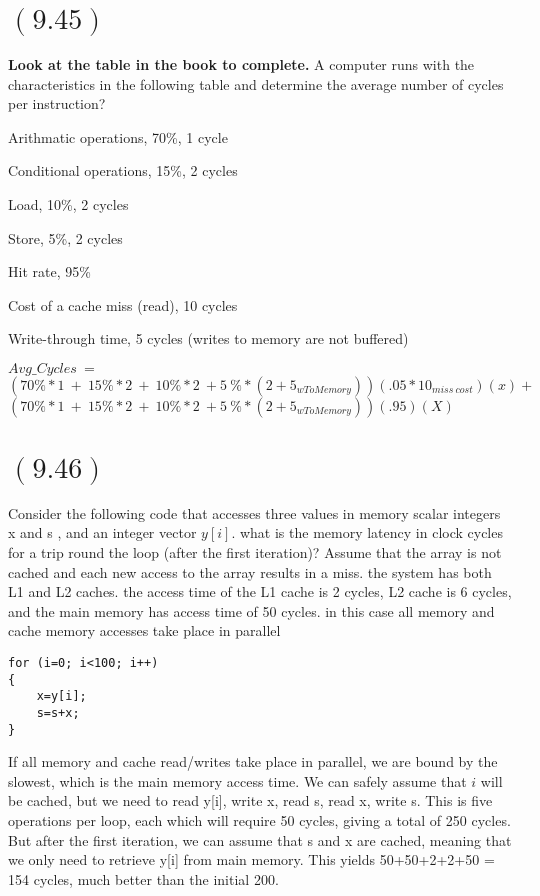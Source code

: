 \documentclass[letterpaper,12pt,titlepage]{article}
\begin{document}
\newpage
\section*{$(9.45)$} \textbf{Look at the table in the book to complete.} A computer runs with the characteristics in the following table and determine the average number of cycles per instruction?

Arithmatic operations, 70\%, 1 cycle

 
Conditional operations, 15\%, 2 cycles


Load, 10\%, 2 cycles


Store, 5\%, 2 cycles


Hit rate, 95\%


Cost of a cache miss (read), 10 cycles

Write-through time, 5 cycles (writes to memory are not buffered)

\begin{mdframed}[style=MyFrame]
$Avg\_Cycles~=~$\\
$(70\%*1~+~15\%*2~+~10\%*2~+5~\%*(2+5_{wToMemory}))(.05*10_{miss~cost})(x)+$\\
              $(70\%*1~+~15\%*2~+~10\%*2~+5~\%*(2+5_{wToMemory}))(.95)(X)$

\end{mdframed}

\section*{$(9.46)$} Consider the following code that accesses three values in memory scalar integers x and s , and an integer vector $y[i]$. what is the memory latency in clock cycles for a trip round the loop (after the first iteration)? Assume that the array is not cached and each new access to the array results in a miss.
the system has both L1 and L2 caches. the access time of the L1 cache is 2 cycles, L2 cache is 6 cycles, and the main memory has access time of 50 cycles. in this case all memory and cache memory accesses take place in parallel
\begin{verbatim}
for (i=0; i<100; i++)
{
    x=y[i];
    s=s+x;
}
\end{verbatim}

\begin{mdframed}[style=MyFrame]
If all memory and cache read/writes take place in parallel, we are bound by the slowest, which is the main memory access time. We can safely assume that $i$ will be cached, but we need to read y[i], write x, read s, read x, write s. This is five operations per loop, each which will require 50 cycles, giving a total of 250 cycles. But after the first iteration, we can assume that s and x are cached, meaning that we only need to retrieve y[i] from main memory. This yields 50+50+2+2+50 = 154 cycles, much better than the initial 200. 
\end{mdframed}
\end{document}
